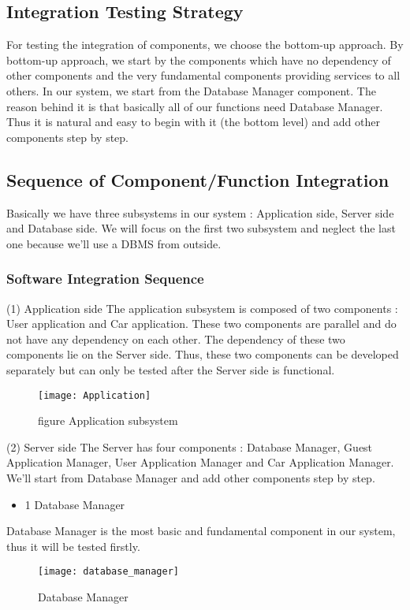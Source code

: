\documentclass{article}
\begin{document}
 \subsection{Integration Testing Strategy}
 For testing the integration of components, we choose the bottom-up approach. By bottom-up approach, we start by the components which have no dependency of other components and the very fundamental components providing services to all others. In our system, we start from the Database Manager component. The reason behind it is that basically all of our functions need Database Manager. Thus it is natural and easy to begin with it (the bottom level) and add other components step by step. 
 \subsection{Sequence of Component/Function Integration}
 Basically we have three subsystems in our system : Application side, Server side and Database side. We will focus on the first two subsystem and neglect the last one because we'll use a DBMS from outside.
  \subsubsection{Software Integration Sequence}
  (1) Application side
  The application subsystem is composed of two components : User application and Car application. These two components are parallel and do not have any dependency on each other. The dependency of these two components lie on the Server side. Thus, these two components can be developed separately but can only be tested after the Server side is functional. 
  \begin{figure}[h]
  	\centering
  	\texttt{[image: Application]}
  	\caption{figure Application subsystem}
  \end{figure}
\newline
 (2) Server side
 The Server has four components : Database Manager, Guest Application Manager, User Application Manager and Car Application Manager. We'll start from Database Manager and add other components step by step. 
 \begin{itemize}
 	\item 1 Database Manager
 \end{itemize}
Database Manager is the most basic and fundamental component in our system, thus it will be tested firstly.
 \begin{figure}[h]
 	\centering
 	\texttt{[image: database\_manager]}
 	\caption{Database Manager}
 \end{figure}
\end{document}
